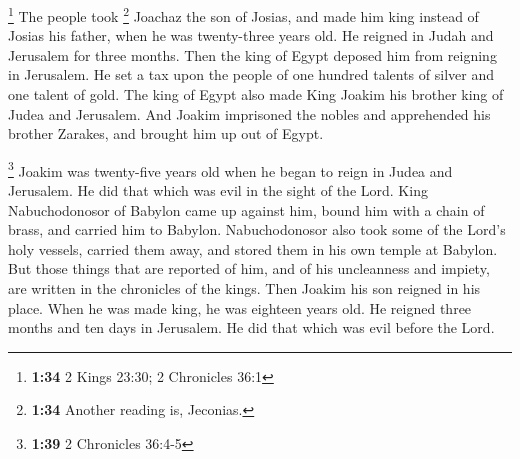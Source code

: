  \footnote{\textbf{1:34} 2 Kings 23:30; 2 Chronicles 36:1}
The people took \footnote{\textbf{1:34} Another reading is, Jeconias.}
Joachaz the son of Josias, and made him king instead of Josias his
father, when he was twenty-three years old.  He reigned
in Judah and Jerusalem for three months. Then the king of Egypt deposed
him from reigning in Jerusalem.  He set a tax upon the
people of one hundred talents of silver and one talent of gold.
 The king of Egypt also made King Joakim his brother king
of Judea and Jerusalem.  And Joakim imprisoned the nobles
and apprehended his brother Zarakes, and brought him up out of Egypt.

 \footnote{\textbf{1:39} 2 Chronicles 36:4-5} Joakim was
twenty-five years old when he began to reign in Judea and Jerusalem. He
did that which was evil in the sight of the Lord.  King
Nabuchodonosor of Babylon came up against him, bound him with a chain of
brass, and carried him to Babylon.  Nabuchodonosor also
took some of the Lord's holy vessels, carried them away, and stored them
in his own temple at Babylon.  But those things that are
reported of him, and of his uncleanness and impiety, are written in the
chronicles of the kings.  Then Joakim his son reigned in
his place. When he was made king, he was eighteen years old.
 He reigned three months and ten days in Jerusalem. He
did that which was evil before the Lord.

